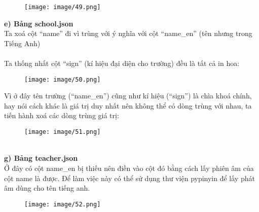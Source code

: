 \newpage
\begin{figure}
    \centering
    \texttt{[image: image/49.png]}
\end{figure}
\textbf{e) Bảng school.json}\\
Ta xoá cột “name” đi vì trùng với ý nghĩa với cột “name\_en” (tên nhưng trong Tiếng Anh)\\
\\
Ta thống nhất cột “sign” (kí hiệu đại diện cho trường) đều là tất cả in hoa:
\newpage
\begin{figure}
    \centering
    \texttt{[image: image/50.png]}
\end{figure}
Vì ở đây tên trường (“name\_en”) cũng như kí hiệu (“sign”) là chìa khoá chính, hay nói cách khác là giá trị duy nhất nên không thể có dòng trùng với nhau, ta tiến hành xoá các dòng trùng giá trị:
\begin{figure}[h]
    \centering
    \texttt{[image: image/51.png]}
\end{figure}\\
\textbf{g) Bảng teacher.json}\\
Ở đây có cột name\_en bị thiếu nên điền vào cột đó bằng cách lấy phiên âm của cột name là được. Để làm việc này có thể sử dụng thư viện pypinyin để lấy phát âm dùng cho tên tiếng anh.
\newpage
\begin{figure}
    \centering
    \texttt{[image: image/52.png]}
\end{figure}
